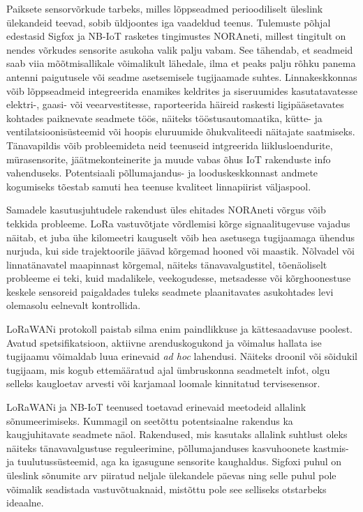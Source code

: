 \documentclass[12pt]{article}
\begin{document}
    Paiksete sensorvõrkude tarbeks, milles lõppseadmed perioodiliselt üleslink ülekandeid teevad, sobib üldjoontes iga vaadeldud teenus.
    Tulemuste põhjal edestasid Sigfox ja NB-IoT rasketes tingimustes NORAneti, millest tingitult on nendes võrkudes sensorite asukoha valik palju vabam.
    See tähendab, et seadmeid saab viia mõõtmisallikale võimalikult lähedale, ilma et peaks palju rõhku panema antenni paigutusele või seadme asetsemisele tugijaamade suhtes.
    Linnakeskkonnas võib lõppseadmeid integreerida enamikes keldrites ja siseruumides kasutatavatesse elektri-, gaasi- või veearvestitesse, raporteerida häireid raskesti ligipääsetavates kohtades paiknevate seadmete töös, näiteks tööstusautomaatika, kütte- ja ventilatsioonisüsteemid või hoopis eluruumide õhukvaliteedi näitajate saatmiseks.
    Tänavapildis võib probleemideta neid teenuseid intgreerida liiklusloendurite, mürasensorite, jäätmekonteinerite ja muude vabas õhus IoT rakenduste info vahenduseks.
    Potentsiaali põllumajandus- ja looduskeskkonnast andmete kogumiseks tõestab samuti hea teenuse kvaliteet linnapiirist väljaspool.

    Samadele kasutusjuhtudele rakendust üles ehitades NORAneti võrgus võib tekkida probleeme.
    LoRa vastuvõtjate võrdlemisi kõrge signaalitugevuse vajadus näitab, et juba ühe kilomeetri kauguselt võib hea asetusega tugijaamaga ühendus nurjuda, kui side trajektoorile jäävad kõrgemad hooned või maastik.
    Nõlvadel või linnatänavatel maapinnast kõrgemal, näiteks tänavavalgustitel, tõenäoliselt probleeme ei teki, kuid madalikele, veekogudesse, metsadesse või kõrghoonestuse keskele sensoreid paigaldades tuleks seadmete plaanitavates asukohtades levi olemasolu eelnevalt kontrollida.

    LoRaWANi protokoll paistab silma enim paindlikkuse ja kättesaadavuse poolest.
    Avatud spetsifikatsioon, aktiivne arenduskogukond ja võimalus hallata ise tugijaamu võimaldab luua erinevaid \textit{ad hoc} lahendusi.
    Näiteks droonil või sõidukil tugijaam, mis kogub ettemääratud ajal ümbruskonna seadmetelt infot, olgu selleks kaugloetav arvesti või karjamaal loomale kinnitatud tervisesensor.

    LoRaWANi ja NB-IoT teenused toetavad erinevaid meetodeid allalink sõnumeerimiseks.
    Kummagil on seetõttu potentsiaalne rakendus ka kaugjuhitavate seadmete näol.
    Rakendused, mis kasutaks allalink suhtlust oleks näiteks tänavavalgustuse reguleerimine, põllumajanduses kasvuhoonete kastmis- ja tuulutussüsteemid, aga ka igasugune sensorite kaughaldus.
    Sigfoxi puhul on üleslink sõnumite arv piiratud neljale ülekandele päevas ning selle puhul pole võimalik seadistada vastuvõtuaknaid, mistõttu pole see selliseks otstarbeks ideaalne.
\end{document}
